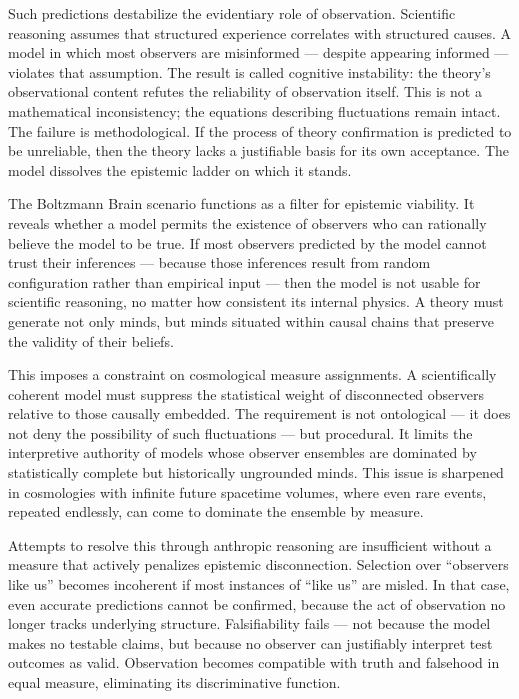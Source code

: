 Such predictions destabilize the evidentiary role of observation. Scientific reasoning assumes that structured experience correlates with structured causes. A model in which most observers are misinformed — despite appearing informed — violates that assumption. The result is called cognitive instability: the theory’s observational content refutes the reliability of observation itself. This is not a mathematical inconsistency; the equations describing fluctuations remain intact. The failure is methodological. If the process of theory confirmation is predicted to be unreliable, then the theory lacks a justifiable basis for its own acceptance. The model dissolves the epistemic ladder on which it stands.

The Boltzmann Brain scenario functions as a filter for epistemic viability. It reveals whether a model permits the existence of observers who can rationally believe the model to be true. If most observers predicted by the model cannot trust their inferences — because those inferences result from random configuration rather than empirical input — then the model is not usable for scientific reasoning, no matter how consistent its internal physics. A theory must generate not only minds, but minds situated within causal chains that preserve the validity of their beliefs.

This imposes a constraint on cosmological measure assignments. A scientifically coherent model must suppress the statistical weight of disconnected observers relative to those causally embedded. The requirement is not ontological — it does not deny the possibility of such fluctuations — but procedural. It limits the interpretive authority of models whose observer ensembles are dominated by statistically complete but historically ungrounded minds. This issue is sharpened in cosmologies with infinite future spacetime volumes, where even rare events, repeated endlessly, can come to dominate the ensemble by measure.

Attempts to resolve this through anthropic reasoning are insufficient without a measure that actively penalizes epistemic disconnection. Selection over “observers like us” becomes incoherent if most instances of “like us” are misled. In that case, even accurate predictions cannot be confirmed, because the act of observation no longer tracks underlying structure. Falsifiability fails — not because the model makes no testable claims, but because no observer can justifiably interpret test outcomes as valid. Observation becomes compatible with truth and falsehood in equal measure, eliminating its discriminative function.

